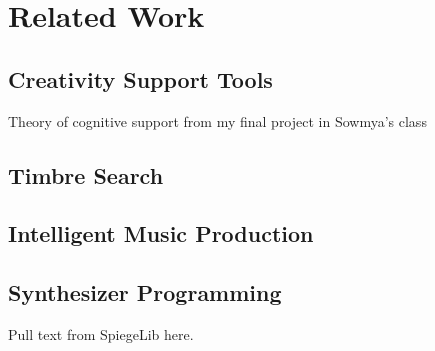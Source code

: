 \chapter{Related Work}

\section{Creativity Support Tools}
Theory of cognitive support from my final project in Sowmya's class

\section{Timbre Search}

\section{Intelligent Music Production}


\section{Synthesizer Programming}
Pull text from SpiegeLib here.


